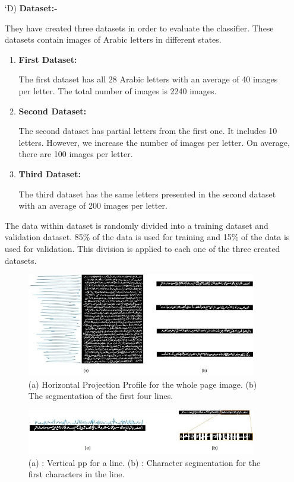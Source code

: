 \begin{itemize}[labelindent=1em,labelsep=0.25cm,leftmargin=*]
        \item[\char `D)] \textbf{Dataset:-}
        
        They have created three datasets in order to evaluate the classifier. These datasets contain images of Arabic letters in different states.
        
        \begin{enumerate}
        \item {\textbf{First Dataset:}}
        
        The first dataset has all 28 Arabic letters with an average of 40 images per letter. The total number of images is 2240 images.
        \item {\textbf{Second Dataset:}}
        
        The second dataset has partial letters from the first one. It includes 10 letters. However, we increase the number of images per letter. On average, there are 100 images per letter.
        \item {\textbf{Third Dataset:}} 
        
        The third dataset has the same letters presented in the second dataset with an average of 200 images per letter.
        \end{enumerate}
        The data within dataset is randomly divided into a training dataset and validation dataset. 85\% of the data is used for training and 15\% of the data is used for validation. This division is applied to each one of the three created datasets.

        \begin{figure}[!htb]
            \centering
            \includegraphics[width=10cm]{images/line_cnn.png}
            \caption{(a) Horizontal Projection Profile for the whole page image. (b) The segmentation of the first four lines.}
            \label{fig:line_cnn}
        \end{figure}
        
        \begin{figure}[!htb]
            \centering
            \includegraphics[width=10cm]{images/char_cnn.png}
            \caption{(a) : Vertical \acrshort{pp} for a line. (b) : Character segmentation for the first characters in the line.}
            \label{fig:char_cnn}
        \end{figure}
        

\end{itemize}
